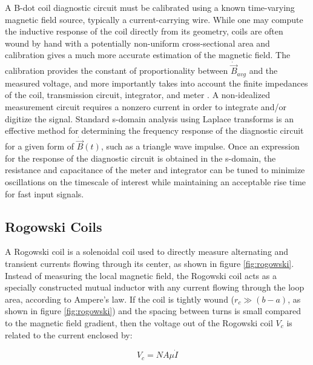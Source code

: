 \documentclass{jpp}
\begin{document}
A B-dot coil diagnostic circuit must be calibrated using a known time-varying magnetic field source, typically a current-carrying wire. While one may compute the inductive response of the coil directly from its geometry, coils are often wound by hand with a potentially non-uniform cross-sectional area and calibration gives a much more accurate estimation of the magnetic field. The calibration provides the constant of proportionality between $\dot {\vec B}_{avg}$ and the measured voltage, and more importantly takes into account the finite impedances of the coil, transmission circuit, integrator, and meter \citep{doi:10.1063/1.3246785}. A non-idealized measurement circuit requires a nonzero current in order to integrate and/or digitize the signal. Standard s-domain analysis using Laplace transforms is an effective method for determining the frequency response of the diagnostic circuit for a given form of $\dot{\vec B}(t)$, such as a triangle wave impulse. Once an expression for the response of the diagnostic circuit is obtained in the s-domain, the resistance and capacitance of the meter and integrator can be tuned to minimize oscillations on the timescale of interest while maintaining an acceptable rise time for fast input signals.

\subsection{Rogowski Coils}

A Rogowski coil is a solenoidal coil used to directly measure alternating and transient currents flowing through its center, as shown in figure \ref{fig:rogowski}. Instead of measuring the local magnetic field, the Rogowski coil acts as a specially constructed mutual inductor with any current flowing through the loop area, according to Ampere's law. If the coil is tightly wound ($r_c \gg (b - a)$, as shown in figure \ref{fig:rogowski}) and the spacing between turns is small compared to the magnetic field gradient, then the voltage out of the Rogowski coil $V_c$ is related to the current enclosed by:

\begin{equation*}
V_c = N A \mu \dot I
\end{equation*}
\end{document}
